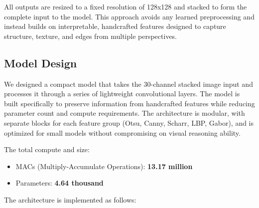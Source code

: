 \documentclass{article}
\begin{document}
All outputs are resized to a fixed resolution of 128x128 and stacked to form the complete input to the model. This approach avoids any learned preprocessing and instead builds on interpretable, handcrafted features designed to capture structure, texture, and edges from multiple perspectives.

\subsection*{Model Design}

We designed a compact model that takes the 30-channel stacked image input and processes it through a series of lightweight convolutional layers. The model is built specifically to preserve information from handcrafted features while reducing parameter count and compute requirements. The architecture is modular, with separate blocks for each feature group (Otsu, Canny, Scharr, LBP, Gabor), and is optimized for small models without compromising on visual reasoning ability.

The total compute and size:
\begin{itemize}
  \item MACs (Multiply-Accumulate Operations): \textbf{13.17 million}
  \item Parameters: \textbf{4.64 thousand}
\end{itemize}

\vspace{1em}

\noindent The architecture is implemented as follows:
\end{document}
